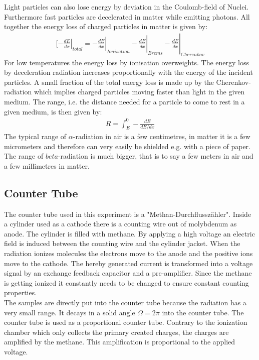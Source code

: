 \documentclass[12pt]{article}
\begin{document}
Light particles can also lose energy by deviation in the Coulomb-field of Nuclei. Furthermore fast particles are decelerated in matter while emitting photons. All together the energy loss of charged particles in matter is given by:
\begin{align}
[\left. \left.\left.\left. -\frac{dE}{dx}\right| _{total}=-\frac{dE}{dx}\right| _{Ionisation}-\frac{dE}{dx}\right|  _{Brems}-\frac{dE}{dx}\right| _{Cherenkov}
\end{align}
For low temperatures the energy loss by ionisation overweights. The energy loss by deceleration radiation increases proportionally with the energy of the incident particles. A small fraction of the total energy loss is made up by the Cherenkov-radiation which implies charged particles moving faster than light in the given medium. The range, i.e. the distance needed for a particle to come to rest in a given medium, is then given by:
\begin{align}
R=\int_{E}^{0}-\frac{dE}{dE/dx}
\end{align}
The typical range of $\alpha$-radiation in air is a few centimetres, in matter it is a few micrometers and therefore can very easily be shielded e.g. with a piece of paper.
The range of $beta$-radiation is much bigger, that is to say a few meters in air and a few millimetres in matter.

 \subsection{Counter Tube}
 
 The counter tube used in this experiment is a "Methan-Durchflusszähler". Inside a cylinder used as a cathode there is a counting wire out of molybdenum as anode. The cylinder is filled with methane. By applying a high voltage an electric field is induced between the counting wire and the cylinder jacket. When the radiation ionizes molecules the electrons move to the anode and the positive ions move to the cathode. The hereby generated current is transformed into a voltage signal by an exchange feedback capacitor and a pre-amplifier.
 Since the methane is getting ionized it constantly needs to be changed to ensure constant counting properties.\\
 
 The samples are directly put into the counter tube because the radiation has a very small range. It decays in a solid angle $\Omega=2\pi$ into the counter tube. The counter tube is used as a proportional counter tube. Contrary to the ionization chamber which only collects the primary created charges, the charges are amplified by the methane. This amplification is proportional to the applied voltage.
 
\end{document}
